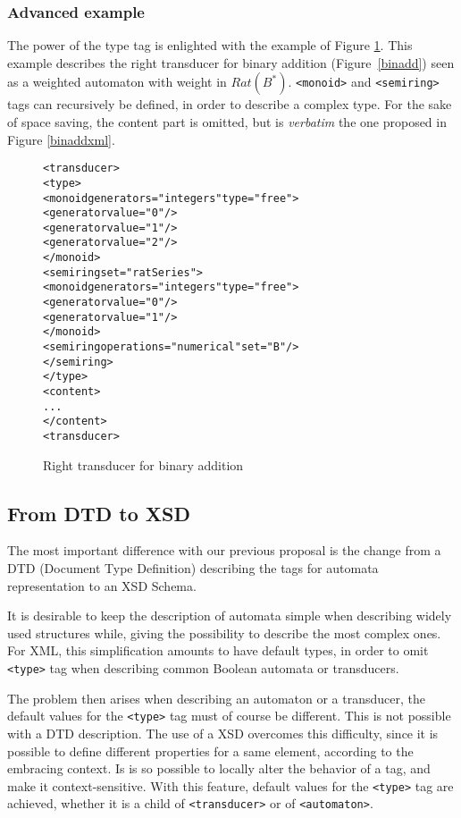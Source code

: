 \documentclass[a4paper]{article}
\begin{document}
\subsubsection{Advanced example}

The power of the type tag is enlighted with the example of Figure
\ref{ratseries1}. This example describes the right transducer for
binary addition (Figure~\ref{binadd}) seen as a weighted automaton with
weight in $Rat(B^*)$. \verb|<monoid>| and \verb|<semiring>| tags can
recursively be defined, in order to describe a complex type. For the
sake of space saving, the content part is omitted, but is
\textit{verbatim} the one proposed in Figure \ref{binaddxml}.


\begin{figure}[h]
  \begin{center}
\begin{alltt}
<transducer>
  <type>
    <monoid generators="integers" type="free">
      <generator value="0"/>
      <generator value="1"/>
      <generator value="2"/>
    </monoid>
    <semiring set="ratSeries">
      <monoid generators="integers" type="free">
        <generator value="0"/>
        <generator value="1"/>
      </monoid>
      <semiring operations="numerical" set="B"/>
    </semiring>
  </type>
  <content>
     ...
  </content>
<transducer>
\end{alltt}

\caption{Right transducer for binary addition}
\label{ratseries1}
  \end{center}
\end{figure}


\subsection{From DTD to XSD}
The most important difference with our previous proposal is the change
from a DTD (Document Type Definition) describing the tags for automata
representation to an XSD Schema.

It is desirable to keep the description of automata simple when
describing widely used structures while, giving the possibility to
describe the most complex ones. For XML, this simplification amounts
to have default types, in order to omit \verb|<type>| tag when
describing common Boolean automata or transducers.

The problem then arises when describing an automaton or a transducer,
the default values for the \verb|<type>| tag must of course be
different. This is not possible with a DTD description.  The use of a
XSD overcomes this difficulty, since it is possible to define
different properties for a same element, according to the embracing
context. Is is so possible to locally alter the behavior of a tag, and
make it context-sensitive. With this feature, default values for the
\verb|<type>| tag are achieved, whether it is a child of
\verb|<transducer>| or of \verb|<automaton>|.
\end{document}
